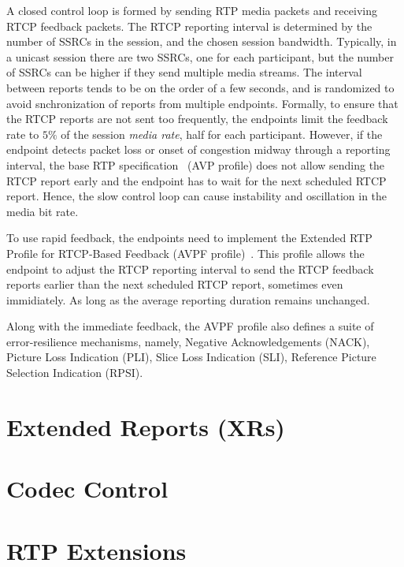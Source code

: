 A closed control loop is formed by sending RTP media packets and receiving
RTCP feedback packets. The RTCP reporting interval is determined by the number
of SSRCs in the session, and the chosen session bandwidth. Typically, in a
unicast session there are two SSRCs, one for each participant, but the number
of SSRCs can be higher if they send multiple media streams. The interval
between reports tends to be on the order of a few seconds, and is randomized
to avoid snchronization of reports from multiple endpoints. Formally, to
ensure that the RTCP reports are not sent too frequently, the endpoints limit
the feedback rate to $5\%$ of the session \textit{media rate}, half for each
participant. However, if the endpoint detects packet loss or onset of
congestion midway through a reporting interval, the base RTP
specification~\cite{rfc3550} (AVP profile) does not allow sending the RTCP
report early and the endpoint has to wait for the next scheduled RTCP report.
Hence, the slow control loop can cause instability and oscillation in the
media bit rate.


To use rapid feedback, the endpoints need to implement the Extended RTP
Profile for RTCP-Based Feedback (AVPF profile)~\cite{rfc4585}. This profile
allows the endpoint to adjust the RTCP reporting interval to send the RTCP
feedback reports earlier than the next scheduled RTCP report, sometimes even
immidiately. As long as the average reporting duration remains unchanged.

Along with the immediate feedback, the AVPF profile also defines a suite of
error-resilience mechanisms, namely, Negative Acknowledgements (NACK), Picture
Loss Indication (PLI), Slice Loss Indication (SLI), Reference Picture
Selection Indication (RPSI). 

\section{Extended Reports (XRs)}




\section{Codec Control}

\section{RTP Extensions}
\label{rtp.ext}
